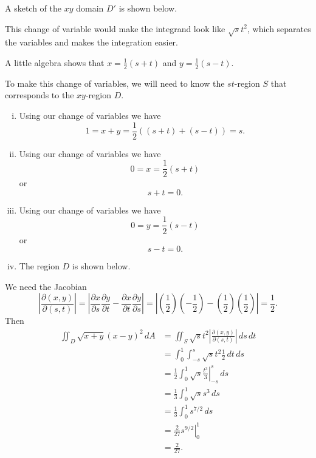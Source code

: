\begin{smallhint}

\end{smallhint}
\begin{bighint}

\end{bighint}
\begin{activitySolution}
	\ba
	\item A sketch of the $xy$ domain $D'$ is shown below.
			
	\item This change of variable would make the integrand look like $\sqrt{s}t^2$, which separates the variables and makes the integration easier. 
	

	\item A little algebra shows that $x = \frac{1}{2}(s+t)$ and $y = \frac{1}{2}(s-t)$.


	\item To make this change of variables, we will need to know the $st$-region $S$ that corresponds to the $xy$-region $D$.
		\begin{enumerate}[i.]
		\item Using our change of variables we have 
\[1 = x+y = \frac{1}{2}((s+t)+(s-t)) = s.\]
	
		\item Using our change of variables we have 
\[0 = x = \frac{1}{2}(s+t)\]
or
\[s+t = 0.\]		
		\item Using our change of variables we have 
\[0 = y = \frac{1}{2}(s-t)\]
or
\[s-t = 0.\]
	
		\item The region $D$ is shown below. 
		
		\end{enumerate}
		
	\item We need the Jacobian
\[\left|\frac{\partial(x,y)}{\partial(s,t)}\right| = \left|\frac{\partial x}{\partial s} \frac{\partial y}{\partial t} - \frac{\partial x}{\partial t} \frac{\partial y}{\partial s}\right| = \left| \left(\frac{1}{2}\right)\left(-\frac{1}{2}\right) - \left(\frac{1}{2}\right)\left(\frac{1}{2}\right)\right| = \frac{1}{2}.\]
Then
\begin{align*}
\iint_D \sqrt{x+y}(x-y)^2 \, dA &= \iint_S \sqrt{s}t^2 \left|\frac{\partial(x,y)}{\partial(s,t)}\right| \, ds \, dt \\
	&= \int_0^1 \int_{-s}^{s} \sqrt{s}t^2 \frac{1}{2} \, dt \, ds \\
	&= \frac{1}{2} \int_0^1 \left. \sqrt{s} \frac{t^3}{3} \right|_{-s}^{s} \, ds \\
	&= \frac{1}{3} \int_0^1 \sqrt{s}s^3 \, ds \\
	&= \frac{1}{3} \int_0^1 s^{7/2} \, ds \\
	&= \frac{2}{27} \left. s^{9/2} \right|_0^1 \\
	&= \frac{2}{27}.
\end{align*}
	\ea
\begin{center}
\end{center}
\end{activitySolution}
\aftera
